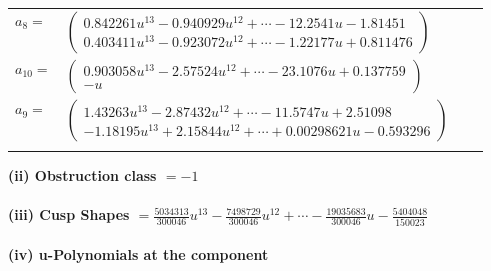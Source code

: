 \documentclass[1p]{elsarticle_modified}
\theoremstyle{definition}
\begin{document}
\begin{tabular}{m{7pt} m{180pt} m{7pt} m{180pt} }
\flushright $a_{8}=$&$\begin{pmatrix}0.842261 u^{13}-0.940929 u^{12}+\cdots-12.2541 u-1.81451\\0.403411 u^{13}-0.923072 u^{12}+\cdots-1.22177 u+0.811476\end{pmatrix}$ \\
\flushright $a_{10}=$&$\begin{pmatrix}0.903058 u^{13}-2.57524 u^{12}+\cdots-23.1076 u+0.137759\\- u\end{pmatrix}$ \\
\flushright $a_{9}=$&$\begin{pmatrix}1.43263 u^{13}-2.87432 u^{12}+\cdots-11.5747 u+2.51098\\-1.18195 u^{13}+2.15844 u^{12}+\cdots+0.00298621 u-0.593296\end{pmatrix}$\\&\end{tabular}
\flushleft \textbf{(ii) Obstruction class $= -1$}\\~\\
\flushleft \textbf{(iii) Cusp Shapes $= \frac{5034313}{300046} u^{13}-\frac{7498729}{300046} u^{12}+\cdots-\frac{19035683}{300046} u-\frac{5404048}{150023}$}\\~\\
\newpage\renewcommand{\arraystretch}{1}
\flushleft \textbf{(iv) u-Polynomials at the component}\newline \\
\end{document}
